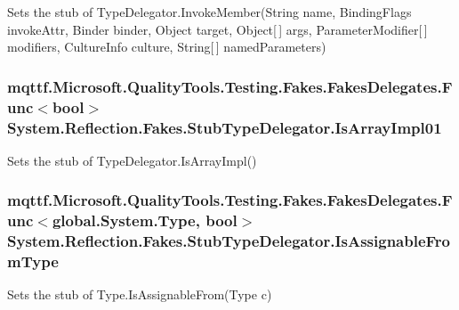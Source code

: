 Sets the stub of Type\-Delegator.\-Invoke\-Member(\-String name, Binding\-Flags invoke\-Attr, Binder binder, Object target, Object\mbox{[}$\,$\mbox{]} args, Parameter\-Modifier\mbox{[}$\,$\mbox{]} modifiers, Culture\-Info culture, String\mbox{[}$\,$\mbox{]} named\-Parameters)

\hypertarget{class_system_1_1_reflection_1_1_fakes_1_1_stub_type_delegator_adfaaf9a12210f2bc365c0ebc16186e72}{
\subsubsection[{Is\-Array\-Impl01}]{\setlength{\rightskip}{0pt plus 5cm}mqttf.\-Microsoft.\-Quality\-Tools.\-Testing.\-Fakes.\-Fakes\-Delegates.\-Func$<$bool$>$ System.\-Reflection.\-Fakes.\-Stub\-Type\-Delegator.\-Is\-Array\-Impl01}}\label{class_system_1_1_reflection_1_1_fakes_1_1_stub_type_delegator_adfaaf9a12210f2bc365c0ebc16186e72}


Sets the stub of Type\-Delegator.\-Is\-Array\-Impl()

\hypertarget{class_system_1_1_reflection_1_1_fakes_1_1_stub_type_delegator_aa35a208a2f42d51e7c17755978c3dca0}{
\subsubsection[{Is\-Assignable\-From\-Type}]{\setlength{\rightskip}{0pt plus 5cm}mqttf.\-Microsoft.\-Quality\-Tools.\-Testing.\-Fakes.\-Fakes\-Delegates.\-Func$<$global.\-System.\-Type, bool$>$ System.\-Reflection.\-Fakes.\-Stub\-Type\-Delegator.\-Is\-Assignable\-From\-Type}}\label{class_system_1_1_reflection_1_1_fakes_1_1_stub_type_delegator_aa35a208a2f42d51e7c17755978c3dca0}


Sets the stub of Type.\-Is\-Assignable\-From(\-Type c)

